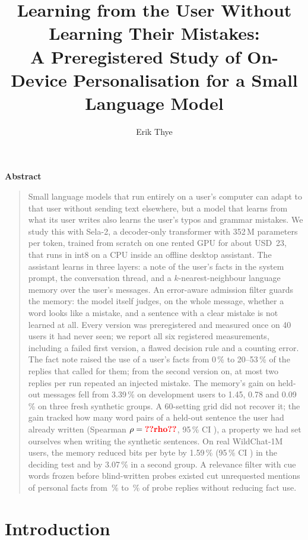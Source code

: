 \documentclass[10pt,twocolumn]{article}
\title{\Large Learning from the User Without Learning Their Mistakes:\\[3pt]
\large A Preregistered Study of On-Device Personalisation for a Small Language Model}
\author{Erik Thye}
\date{}
\renewenvironment{abstract}{\begin{center}\large\bfseries Abstract\end{center}\vspace{-1.2ex}\begin{quote}\small}%
  {\end{quote}\vspace{0.5ex}}
\newcommand{\pct}{\,\%}
\begin{document}
\maketitle

\begin{abstract}
Small language models that run entirely on a user's computer can adapt to that user without sending text elsewhere,
but a model that learns from what its user writes also learns the user's typos and grammar mistakes. We study this
with Sela-2, a decoder-only transformer with 352\,M parameters per token, trained from scratch on one rented GPU for
about USD~23, that runs in int8 on a CPU inside an offline desktop assistant. The assistant learns in three layers: a
note of the user's facts in the system prompt, the conversation thread, and a $k$-nearest-neighbour language memory
over the user's messages. An error-aware admission filter guards the memory: the model itself judges, on the whole
message, whether a word looks like a mistake, and a sentence with a clear mistake is not learned at all. Every version was preregistered and measured once on 40 users it
had never seen; we report all six registered measurements, including a failed first version, a flawed decision rule
and a counting error. The fact note raised the use of a user's facts from 0\pct{} to 20--53\pct{} of the replies that
called for them; from the second version on, at most two replies per run repeated an injected mistake. The memory's
gain on held-out messages fell from 3.39\pct{} on development users to 1.45, 0.78 and 0.09\pct{} on three fresh
synthetic groups. A 60-setting grid did not recover it; the gain tracked how many word pairs of a held-out sentence the
user had already written (Spearman $\rho = \stat{rho}$, 95\pct{} CI ), a property we had set ourselves
when writing the synthetic sentences. On real WildChat-1M users, the memory reduced bits per byte by 1.59\pct{}
(95\pct{} CI ) in the deciding test and by 3.07\pct{} in a second group. A relevance filter with cue
words frozen before blind-written probes existed cut unrequested mentions of personal facts from \pct{}
to \pct{} of probe replies without reducing fact use.
\end{abstract}

\section{Introduction}\label{sec:intro}
\end{document}
